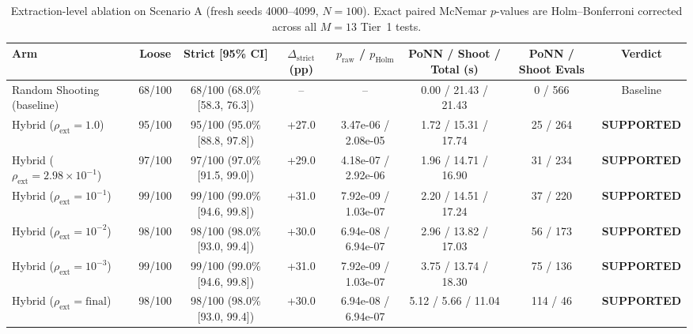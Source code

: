 \begin{table}[t]
\centering
\caption{Extraction-level ablation on Scenario A (fresh seeds 4000--4099, $N=100$). Exact paired McNemar $p$-values are Holm--Bonferroni corrected across all $M=13$ Tier~1 tests.}
\label{tab:extraction_ablation}
\begin{tabular}{lccccccc}
\toprule
Arm & Loose & Strict [95\% CI] & $\Delta_{\mathrm{strict}}$ (pp) & $p_{\mathrm{raw}}$ / $p_{\mathrm{Holm}}$ & PoNN / Shoot / Total (s) & PoNN / Shoot Evals & Verdict \\
\midrule
Random Shooting (baseline) & 68/100 & 68/100 (68.0\% [58.3, 76.3]) & -- & -- & 0.00 / 21.43 / 21.43 & 0 / 566 & Baseline \\
Hybrid ($\rho_{\mathrm{ext}}=1.0$) & 95/100 & 95/100 (95.0\% [88.8, 97.8]) & +27.0 & 3.47e-06 / 2.08e-05 & 1.72 / 15.31 / 17.74 & 25 / 264 & \textbf{SUPPORTED} \\
Hybrid ($\rho_{\mathrm{ext}}=2.98\times 10^{-1}$) & 97/100 & 97/100 (97.0\% [91.5, 99.0]) & +29.0 & 4.18e-07 / 2.92e-06 & 1.96 / 14.71 / 16.90 & 31 / 234 & \textbf{SUPPORTED} \\
Hybrid ($\rho_{\mathrm{ext}}=10^{-1}$) & 99/100 & 99/100 (99.0\% [94.6, 99.8]) & +31.0 & 7.92e-09 / 1.03e-07 & 2.20 / 14.51 / 17.24 & 37 / 220 & \textbf{SUPPORTED} \\
Hybrid ($\rho_{\mathrm{ext}}=10^{-2}$) & 98/100 & 98/100 (98.0\% [93.0, 99.4]) & +30.0 & 6.94e-08 / 6.94e-07 & 2.96 / 13.82 / 17.03 & 56 / 173 & \textbf{SUPPORTED} \\
Hybrid ($\rho_{\mathrm{ext}}=10^{-3}$) & 99/100 & 99/100 (99.0\% [94.6, 99.8]) & +31.0 & 7.92e-09 / 1.03e-07 & 3.75 / 13.74 / 18.30 & 75 / 136 & \textbf{SUPPORTED} \\
Hybrid ($\rho_{\mathrm{ext}}=\mathrm{final}$) & 98/100 & 98/100 (98.0\% [93.0, 99.4]) & +30.0 & 6.94e-08 / 6.94e-07 & 5.12 / 5.66 / 11.04 & 114 / 46 & \textbf{SUPPORTED} \\
\bottomrule
\end{tabular}
\end{table}
